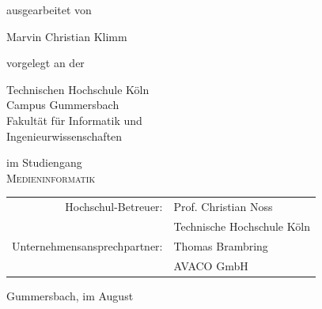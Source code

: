 \begin{titlepage}
\begin{center}
\begin{large}
ausgearbeitet von\\ 
\vspace{0.3cm}
\begin{LARGE}
Marvin Christian Klimm\\
\end{LARGE}
\end{large}

\vspace{1.2cm}

\vspace{0.6cm}

\begin{large}
vorgelegt an der\\ 
\vspace{0.2cm}
\begin{scshape}
Technischen Hochschule Köln\\
Campus Gummersbach\\
Fakultät für Informatik und\\
Ingenieurwissenschaften\\
\end{scshape}
\end{large}

\vspace{0.6cm}

\begin{large}
im Studiengang\\ 
\vspace{0.1cm}
\textsc{Medieninformatik}
\end{large}


\vspace{1.1cm}

\begin{tabular}{rl}
      Hochschul-Betreuer:  &  Prof. Christian Noss\\
       					&  \small Technische Hochschule Köln \\[1.0em]
      Unternehmensansprechpartner:  &  Thomas Brambring\\
       					&  \small AVACO GmbH\\
\end{tabular}

\vspace{0.7cm}

\begin{large}
Gummersbach, im August \the\year
\end{large}


\end{center}
\end{titlepage}

